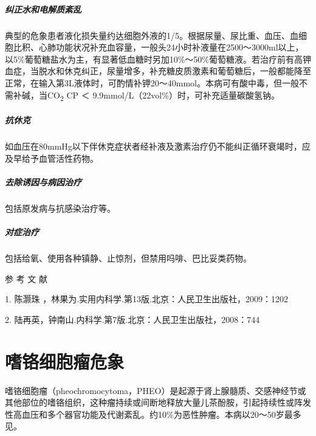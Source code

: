 \paragraph{纠正水和电解质紊乱}

典型的危象患者液化损失量约达细胞外液的1/5。根据尿量、尿比重、血压、血细胞比积、心肺功能状况补充血容量，一般头24小时补液量在2500～3000ml以上，以5\%葡萄糖盐水为主，有显著低血糖时另加10\%～50\%葡萄糖液。若治疗前有高钾血症，当脱水和休克纠正，尿量增多，补充糖皮质激素和葡萄糖后，一般都能降至正常，在输入第3L液体时，可酌情补钾20～40mmol。本病可有酸中毒，但一般不需补碱，当CO\textsubscript{2}
CP ＜ 9.9mmol/L（22vol\%）时，可补充适量碳酸氢钠。

\paragraph{抗休克}

如血压在80mmHg以下伴休克症状者经补液及激素治疗仍不能纠正循环衰竭时，应及早给予血管活性药物。

\paragraph{去除诱因与病因治疗}

包括原发病与抗感染治疗等。

\paragraph{对症治疗}

包括给氧、使用各种镇静、止惊剂，但禁用吗啡、巴比妥类药物。
\protect\hypertarget{text00117.html}{}{}

\hypertarget{text00117.htmlux5cux23CHP4-11-4}{}
参 考 文 献

1. 陈灏珠 ，林果为.实用内科学.第13版.北京：人民卫生出版社，2009：1202

2. 陆再英，钟南山.内科学.第7版.北京：人民卫生出版社，2008：744

\protect\hypertarget{text00118.html}{}{}

\chapter{嗜铬细胞瘤危象}

嗜铬细胞瘤（pheochromocytoma，PHEO）是起源于肾上腺髓质、交感神经节或其他部位的嗜铬组织，这种瘤持续或间断地释放大量儿茶酚胺，引起持续性或阵发性高血压和多个器官功能及代谢紊乱。约10\%为恶性肿瘤。本病以20～50岁最多见。

